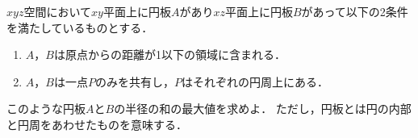 \documentclass[../../main.tex]{subfiles}
\begin{document}
$xyz$空間において$xy$平面上に円板$A$があり$xz$平面上に円板$B$があって以下の2条件を満たしているものとする．
\begin{enumerate}
  \item $A$，$B$は原点からの距離が1以下の領域に含まれる．
  \item $A$，$B$は一点$P$のみを共有し，$P$はそれぞれの円周上にある．
\end{enumerate}
このような円板$A$と$B$の半径の和の最大値を求めよ．
ただし，円板とは円の内部と円周をあわせたものを意味する．
\end{document}

